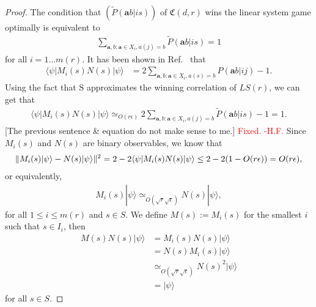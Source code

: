 \documentclass[11pt,letterpaper]{article}
\newcommand{\ket}[1]{|#1\rangle}
\newcommand{\bra}[1]{\langle#1|}
\DeclarePairedDelimiter{\norm}{\lVert}{\rVert}
\newcommand{\1}{\mathbb{1}}
\newcommand{\LS}{LS}
\newcommand{\mr}{m(r)}
\newcommand{\fC}{\mathfrak{C}}
\newcommand{\ba}{\pmb{a}}
\newcommand{\bS}{\mathrm{S}}
\newcommand{\pr}[2]{P(#1|#2)}
\newcommand{\tpr}[2]{\tilde{P}(#1|#2)}
\newcommand{\ep}{\epsilon}
\newcommand{\se}{\sqrt{\epsilon}}
\newcommand{\sr}{\sqrt{r}}
\newcommand{\appd}[1]{\simeq_{#1}}
\def\carl#1{{\color{blue} #1}}
\newcommand{\hfc}[1]{\textcolor{red}{#1 -H.F.}}
\theoremstyle{definition}
\begin{document}
\begin{proof}
The condition that $(\tpr{\ba b}{i s})$ of $\fC(d,r)$ wins the linear system game optimally is equivalent to
\begin{align*}
\sum_{\ba,b: \ba \in X_i, a(j) = b} \tpr{\ba b}{is} = 1
\end{align*}
for all $i = 1 \dots \mr$.
It has been shown in Ref.~\cite{slofstra2017} that 
\begin{align*}
	\bra{\psi} M_i(s) N(s) \ket{\psi} &= 2 \sum_{\ba,b: \ba \in X_i, a(s) = b} \pr{\ba b}{ij} -1.
\end{align*}
Using the fact that $\bS$ approximates the winning correlation of $\LS(r)$, 
we can get that
\begin{align*}
	\bra{\psi} M_i(s) N(s) \ket{\psi} \appd{O(r \ep)} 2\sum_{\ba,b: \ba \in X_i, a(j) = b} \tpr{\ba b}{is} - 1 = 1.
\end{align*}
\carl{[The previous sentence \& equation do not make sense to me.]}
\hfc{Fixed.}
Since $M_i(s)$ and $N(s)$ are binary observables, we know that
\begin{align*}
    \norm{M_i(s)\ket{\psi} - N(s)\ket{\psi}}^2 
    = 2 - 2 \bra{\psi}M_i(s)N(s) \ket{\psi} 
    \leq 2 - 2(1 - O(r\ep)) = O(r\ep),
\end{align*}
or equivalently,
\begin{align*}
	M_{i}(s) \ket{\psi} \appd{O(\sr\se)} N(s) \ket{\psi},
\end{align*}
for all $1 \leq i \leq \mr$ and $s \in S$.
We define $M(s) := M_{i}(s)$ for the smallest $i$ such that $ s \in I_i$, then 
\begin{align*}
	M(s) N(s) \ket{\psi} & = M_{i}(s)N(s)\ket{\psi} \\
	    & = N(s) M_{i}(s) \ket{\psi} \\
	    &\appd{O(\sr\se)} N(s)^2 \ket{\psi} \\
	    &= \ket{\psi}
\end{align*}
for all $s \in S$.


\end{proof}
\end{document}
